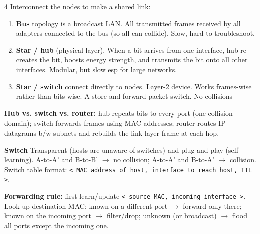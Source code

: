 \documentclass[10pt]{extarticle}
\begin{document}
\begin{multicols}{4}
\vspace{-0.3em}
Interconnect the nodes to make a shared link:
\begin{enumerate}
\item \textbf{Bus} topology is a broadcast LAN. All transmitted frames received by all adapters connected to the bus (so all can collide). Slow, hard to troubleshoot.
\item \textbf{Star / hub} (physical layer). When a bit arrives from one interface, hub re-creates the bit, boosts energy strength, and transmits the bit onto all other interfaces. Modular, but slow esp for large networks.
\item \textbf{Star / switch} connect directly to nodes. Layer-2 device. Works frames-wise rather than bits-wise. A store-and-forward packet switch. No collisions
\end{enumerate}
\textbf{Hub vs. switch vs. router:} hub repeats bits to every port (one
collision domain); switch forwards frames using MAC addresses; router routes
IP datagrams b/w subnets and rebuilds the link-layer frame at each hop.

\textbf{Switch}
Transparent (hosts are unaware of switches) and plug-and-play (self-learning).
A-to-A’ and B-to-B’ $\rightarrow$ no collision; A-to-A’ and B-to-A’ $\rightarrow$ collision.
Switch table format: \texttt{< MAC address of host, interface to reach host, TTL >}.

\textbf{Forwarding rule:} first learn/update \texttt{< source MAC, incoming
interface >}. Look up destination MAC: known on a different port $\rightarrow$
forward only there; known on the incoming port $\rightarrow$ filter/drop;
unknown (or broadcast) $\rightarrow$ flood all ports except the incoming one.


\end{multicols}
\end{document}

